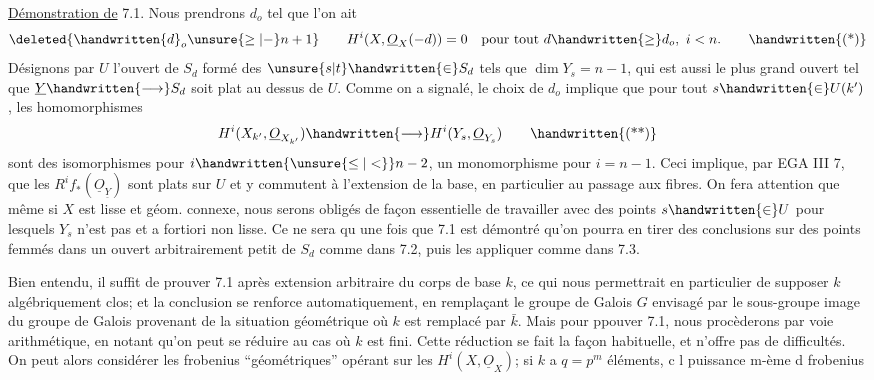 \uline{Démonstration de} 7.1. Nous prendrons  $d_o$   tel que l'on ait 
\[
\deleted{\handwritten{d}_o\unsure{\geq|-}n+1}\qquad H^i(X,\underline{O}_X(-d))=0\quad\text{pour tout }d\handwritten{\geq}d_o,\ i<n.
\tag*{\handwritten{(*)}}
\]
Désignons par $U$ l'ouvert de $S_d$ formé des $\unsure{s|t}\handwritten{\in}S_d$ tels que $\dim Y_s=n-1$, qui est aussi le plus grand ouvert tel que $\underline{Y}\handwritten{\longrightarrow}S_d$ soit plat au dessus de $U$. Comme on a signalé, le choix de $d_o$ implique que pour tout $s\handwritten{\in}U(k')$, les homomorphismes
\[
H^i(X_{k'},\underline{O}_{X_{k'}})\handwritten{\longrightarrow}H^i(Y_s,\underline{O}_{Y_s})
\tag*{\handwritten{(**)}}
\]
sont des isomorphismes pour $i\handwritten{\unsure{\leq|<}}n-2$, un monomorphisme pour $i=n-1$. Ceci implique, par EGA III 7, que les $R^if_*(\underline{O}_{\underline{Y}})$ sont plats sur $U$ et y commutent à l'extension de la base, en particulier au passage aux fibres. On fera attention que même si $X$ est lisse et géom. connexe, nous serons obligés de façon essentielle de travailler avec des points $s\handwritten{\in}U$ pour lesquels $Y_s$ n'est pas  et a fortiori non lisse. Ce ne sera qu une fois que 7.1 est démontré qu'on pourra en tirer des conclusions  sur des points femmés dans un ouvert arbitrairement petit de $S_d$ comme dans 7.2, puis les appliquer comme dans 7.3.

Bien entendu, il suffit de prouver 7.1 après extension arbitraire du corps de base $k$, ce qui nous permettrait en particulier de supposer $k$ algébriquement clos; et la conclusion se renforce  automatiquement, en remplaçant le groupe de Galois $G$ envisagé par le sous-groupe image du groupe de Galois provenant de la situation géométrique où $k$ est remplacé par $\bar{k}$. Mais pour ppouver 7.1, nous procèderons  par voie arithmétique, en notant qu'on peut se réduire au cas où $k$ est fini. Cette réduction se fait  la façon habituelle, et n'offre pas de difficultés.  On peut alors considérer les frobenius ``géométriques'' opérant sur les $H^i(X,\underline{O}_X)$; si $k$ a $q=p^m$ éléments, c  l puissance m-ème d frobenius

